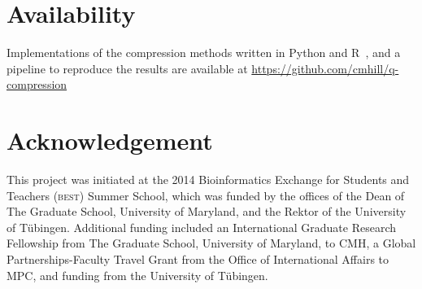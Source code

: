 \documentclass{bioinfo}
\begin{document}
\section{Availability}
Implementations of the compression methods written in Python and
R~\citep{R-Core-Team:2014yq}, and a pipeline to reproduce the results
are available at \url{https://github.com/cmhill/q-compression}

\section*{Acknowledgement}
This project was initiated at the 2014 Bioinformatics Exchange for
Students and Teachers (\textsc{best}) Summer School, which was funded
by the offices of the Dean of The Graduate School, University of
Maryland, and the Rektor of the University of T\"{u}bingen. Additional
funding included an International Graduate Research Fellowship from
The Graduate School, University of Maryland, to CMH, a Global
Partnerships-Faculty Travel Grant from the Office of International
Affairs to MPC, and funding from the University of T\"{u}bingen.






%

%


\end{document}
